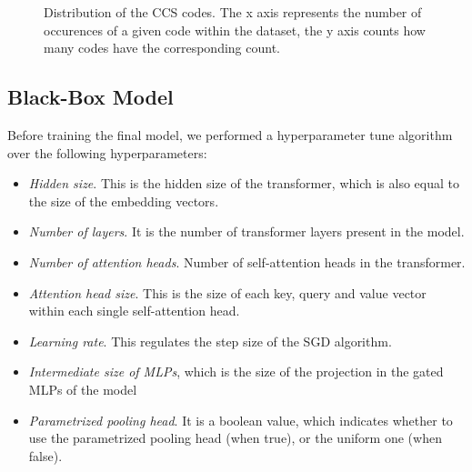 \documentclass[]{marticle}
\begin{document}
\begin{figure}[!tb] 
\caption{
    Distribution of the CCS codes. The x axis represents the number of occurences of a given code
    within the dataset, the y axis counts how many codes have the corresponding count.
} 
\label{fig:ccs-dist} 
\end{figure}


\subsection{Black-Box Model}

Before training the final model, we performed a hyperparameter tune algorithm over the following
hyperparameters:
\begin{itemize}
\item \textit{Hidden size}. This is the hidden size of the transformer, which is also equal to the
    size of the embedding vectors.

\item \textit{Number of layers}. It is the number of transformer layers present in the model.

\item \textit{Number of attention heads}. Number of self-attention heads in the transformer.

\item \textit{Attention head size}. This is the size of each key, query and value vector within each
    single self-attention head.

\item \textit{Learning rate}. This regulates the step size of the SGD algorithm.

\item \textit{Intermediate size of MLPs}, which is the size of the projection in the gated MLPs of
    the model

\item \textit{Parametrized pooling head}. It is a boolean value, which indicates whether to use the
    parametrized pooling head (when true), or the uniform one (when false).
\end{itemize}
\end{document}
